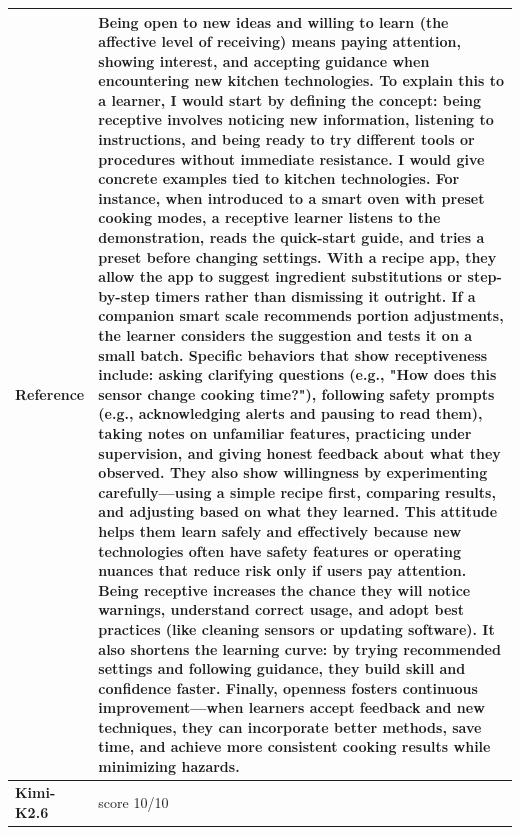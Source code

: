 \begin{longtable}{@{}l p{12.5cm}@{}}
  \textbf{Reference} & Being open to new ideas and willing to learn (the affective level of receiving) means paying attention, showing interest, and accepting guidance when encountering new kitchen technologies. To explain this to a learner, I would start by defining the concept: being receptive involves noticing new information, listening to instructions, and being ready to try different tools or procedures without immediate resistance. \newline I would give concrete examples tied to kitchen technologies. For instance, when introduced to a smart oven with preset cooking modes, a receptive learner listens to the demonstration, reads the quick-start guide, and tries a preset before changing settings. With a recipe app, they allow the app to suggest ingredient substitutions or step-by-step timers rather than dismissing it outright. If a companion smart scale recommends portion adjustments, the learner considers the suggestion and tests it on a small batch. \newline Specific behaviors that show receptiveness include: asking clarifying questions (e.g., "How does this sensor change cooking time?"), following safety prompts (e.g., acknowledging alerts and pausing to read them), taking notes on unfamiliar features, practicing under supervision, and giving honest feedback about what they observed. They also show willingness by experimenting carefully---using a simple recipe first, comparing results, and adjusting based on what they learned. \newline This attitude helps them learn safely and effectively because new technologies often have safety features or operating nuances that reduce risk only if users pay attention. Being receptive increases the chance they will notice warnings, understand correct usage, and adopt best practices (like cleaning sensors or updating software). It also shortens the learning curve: by trying recommended settings and following guidance, they build skill and confidence faster. Finally, openness fosters continuous improvement---when learners accept feedback and new techniques, they can incorporate better methods, save time, and achieve more consistent cooking results while minimizing hazards. \\
  \midrule
  \textbf{Kimi-K2.6} & score 10/10 \\

\end{longtable}
